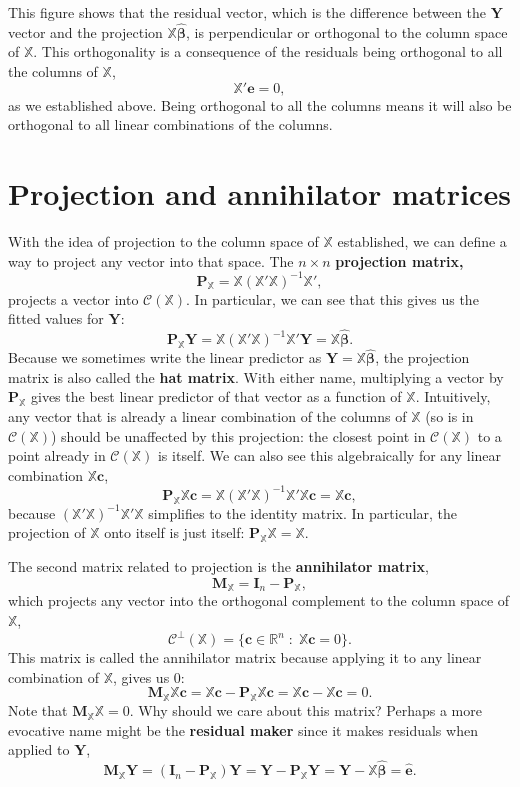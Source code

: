 \documentclass[
  13pt,
  letterpaper,
  DIV=11,
  numbers=noendperiod]{scrreprt}
\newcommand{\mb}{\symbf}
\newcommand{\Xmat}{\mathbb{X}}
\newcommand{\bhat}{\widehat{\mb{\beta}}}
\theoremstyle{plain}
\theoremstyle{definition}
\theoremstyle{definition}
\theoremstyle{remark}
\begin{document}
This figure shows that the residual vector, which is the difference
between the \(\mb{Y}\) vector and the projection \(\Xmat\bhat\), is
perpendicular or orthogonal to the column space of \(\Xmat\). This
orthogonality is a consequence of the residuals being orthogonal to all
the columns of \(\Xmat\), \[ 
\Xmat'\mb{e} = 0,
\] as we established above. Being orthogonal to all the columns means it
will also be orthogonal to all linear combinations of the columns.

\section{Projection and annihilator
matrices}\label{projection-and-annihilator-matrices}

With the idea of projection to the column space of \(\Xmat\)
established, we can define a way to project any vector into that space.
The \(n\times n\) \textbf{projection matrix,} \[
\mb{P}_{\Xmat} = \Xmat (\Xmat'\Xmat)^{-1} \Xmat',
\] projects a vector into \(\mathcal{C}(\Xmat)\). In particular, we can
see that this gives us the fitted values for \(\mb{Y}\): \[ 
\mb{P}_{\Xmat}\mb{Y} = \Xmat (\Xmat'\Xmat)^{-1} \Xmat'\mb{Y} = \Xmat\bhat.
\] Because we sometimes write the linear predictor as
\(\widehat{\mb{Y}} = \Xmat\bhat\), the projection matrix is also called
the \textbf{hat matrix}. With either name, multiplying a vector by
\(\mb{P}_{\Xmat}\) gives the best linear predictor of that vector as a
function of \(\Xmat\). Intuitively, any vector that is already a linear
combination of the columns of \(\Xmat\) (so is in
\(\mathcal{C}(\Xmat)\)) should be unaffected by this projection: the
closest point in \(\mathcal{C}(\Xmat)\) to a point already in
\(\mathcal{C}(\Xmat)\) is itself. We can also see this algebraically for
any linear combination \(\Xmat\mb{c}\), \[
\mb{P}_{\Xmat}\Xmat\mb{c} = \Xmat (\Xmat'\Xmat)^{-1} \Xmat'\Xmat\mb{c} = \Xmat\mb{c},
\] because \((\Xmat'\Xmat)^{-1} \Xmat'\Xmat\) simplifies to the identity
matrix. In particular, the projection of \(\Xmat\) onto itself is just
itself: \(\mb{P}_{\Xmat}\Xmat = \Xmat\).

The second matrix related to projection is the \textbf{annihilator
matrix}, \[ 
\mb{M}_{\Xmat} = \mb{I}_{n} - \mb{P}_{\Xmat},
\] which projects any vector into the orthogonal complement to the
column space of \(\Xmat\), \[
\mathcal{C}^{\perp}(\Xmat) = \{\mb{c} \in \mathbb{R}^n\;:\; \Xmat\mb{c} = 0 \}.
\] This matrix is called the annihilator matrix because applying it to
any linear combination of \(\Xmat\), gives us 0: \[ 
\mb{M}_{\Xmat}\Xmat\mb{c} = \Xmat\mb{c} - \mb{P}_{\Xmat}\Xmat\mb{c} = \Xmat\mb{c} - \Xmat\mb{c} = 0.
\] Note that \(\mb{M}_{\Xmat}\Xmat = 0\). Why should we care about this
matrix? Perhaps a more evocative name might be the \textbf{residual
maker} since it makes residuals when applied to \(\mb{Y}\), \[ 
\mb{M}_{\Xmat}\mb{Y} = (\mb{I}_{n} - \mb{P}_{\Xmat})\mb{Y} = \mb{Y} - \mb{P}_{\Xmat}\mb{Y} = \mb{Y} - \Xmat\bhat = \widehat{\mb{e}}.
\]
\end{document}
